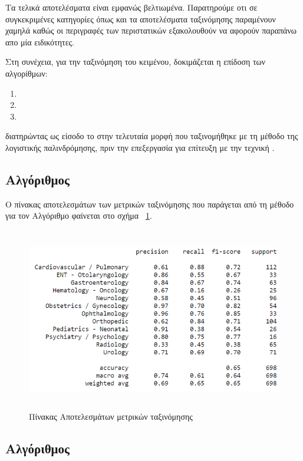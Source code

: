 Τα τελικά αποτελέσματα είναι εμφανώς βελτιωμένα. 
Παρατηρούμε οτι σε συγκεκριμένες κατηγορίες όπως  και  τα αποτελέσματα ταξινόμησης παραμένουν χαμηλά καθώς οι περιγραφές των περιστατικών εξακολουθούν να αφορούν παραπάνω απο μία ειδικότητες. 


Στη συνέχεια, για την ταξινόμηση του κειμένου, δοκιμάζεται η επίδοση των αλγορίθμων:
\begin{enumerate}
    \item {} 
    \item {}
    \item {}
\end{enumerate}


διατηρώντας ως είσοδο το  στην τελευταία μορφή που ταξινομήθηκε με τη μέθοδο της λογιστικής παλινδρόμησης, πριν την επεξεργασία για επίτευξη  με την τεχνική .

\clearpage
\subsection{Αλγόριθμος }
Ο πίνακας αποτελεσμάτων των μετρικών ταξινόμησης που παράγεται από τη μέθοδο  για τον Αλγόριθμο  φαίνεται στο σχήμα ~\ref{figure5.12}.

\begin{figure} [ht!]
\centering
\includegraphics[width=\textwidth,height=8cm,keepaspectratio]{pictures/NAiveBAyes_NO_SMOTE.png} 
\caption{Πίνακας Αποτελεσμάτων μετρικών ταξινόμησης}\label{figure5.12}
\end{figure}
\clearpage

\subsection{Αλγόριθμος }

